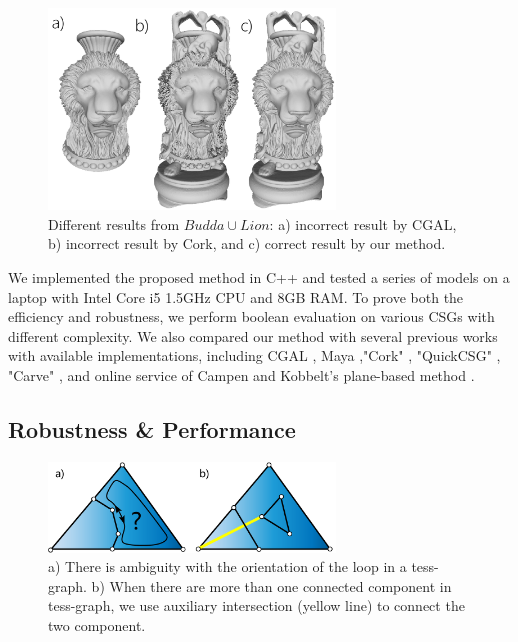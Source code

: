 \documentclass[10pt,journal,compsoc]{IEEEtran}
\begin{document}
\begin{figure}[t]
\centering
\includegraphics[width=3in]{buddalion}
\caption{ Different results from $Budda\cup Lion$: a) incorrect result by CGAL, b) incorrect result by Cork, and c) correct result by our method. }
\label{fig:buddalion}
\end{figure}

We implemented the proposed method in C++ and tested a series of models on a laptop with Intel Core i5 1.5GHz CPU and 8GB RAM. To prove both the efficiency and robustness, we perform boolean evaluation on various CSGs with different complexity. We also compared our method with several previous works with available implementations, including CGAL \cite{cgal:hk-bonp3-15a}, Maya \cite{Maya2015,barki2015exact},"Cork" \cite{Cork}, "QuickCSG" \cite{douze2015quickcsg}, "Carve" \cite{Carve}, and online service of Campen and Kobbelt's plane-based method \cite{campen2010exact,WebBSP}.



\subsection{Robustness \& Performance}



\begin{figure}[t]
\centering
\includegraphics[width=3in]{dual}
\caption{a) There is ambiguity with the orientation of the loop in a tess-graph. b) When there are more than one connected component in tess-graph, we use auxiliary intersection (yellow line) to connect the two component. }
\label{fig:dual}
\end{figure}
\end{document}
